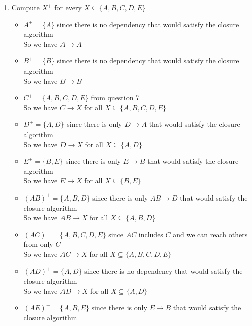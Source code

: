 \documentclass[12pt]{article}
\begin{document}
\begin{enumerate}
  \item Compute $X^+$ for every $X \subseteq \{A, B, C, D, E\}$
        \begin{itemize}
          \item $A^+ = \{A\}$ since there is no dependency that would
                satisfy the closure algorithm \\
                So we have $A \longrightarrow A$
          \item $B^+ = \{B\}$ since there is no dependency that would
                satisfy the closure algorithm \\
                So we have $B \longrightarrow B$
          \item $C^+ = \{A, B, C, D, E\}$ from question 7 \\
                So we have $C \longrightarrow X$ for all $X \subseteq \{A, B, C,
                D, E\}$
          \item $D^+ = \{A, D\}$ since there is only $D \longrightarrow A$ that
                would satisfy the closure algorithm \\
                So we have $D \longrightarrow X$ for all $X \subseteq \{A, D\}$
          \item $E^+ = \{B, E\}$ since there is only $E \longrightarrow B$ that
                would satisfy the closure algorithm \\
                So we have $E \longrightarrow X$ for all $X \subseteq \{B, E\}$
          \item $(AB)^+ = \{A, B, D\}$ since there is only $AB \longrightarrow
                D$ that would satisfy the closure algorithm \\
                So we have $AB \longrightarrow X$ for all $X \subseteq \{A, B,
                D\}$
          \item $(AC)^+ = \{A, B, C, D, E\}$ since $AC$ includes $C$ and we can
                reach others from only $C$ \\
                So we have $AC \longrightarrow X$ for all $X \subseteq \{A, B,
                C, D, E\}$
          \item $(AD)^+ = \{A, D\}$ since there is no dependency that would
                satisfy the closure algorithm \\
                So we have $AD \longrightarrow X$ for all $X \subseteq \{A, D\}$
          \item $(AE)^+ = \{A, B, E\}$ since there is only $E \longrightarrow B$
                that would satisfy the closure algorithm \\

\end{itemize}
\end{enumerate}
\end{document}

